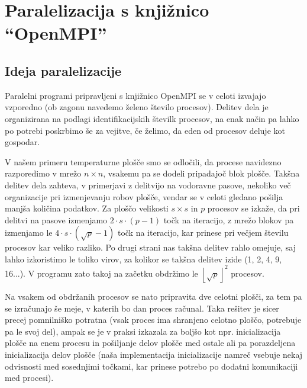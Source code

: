 \documentclass[a4paper,titlepage,11pt]{article}
\begin{document}
\pagebreak

\section{Paralelizacija s knjižnico ``OpenMPI''}
\label{poglavje-mpi}

\subsection{Ideja paralelizacije}

Paralelni programi pripravljeni s knjižnico OpenMPI se v celoti izvajajo vzporedno (ob zagonu navedemo želeno število procesov). Delitev dela je organizirana na podlagi identifikacijskih številk procesov, na enak način pa lahko po potrebi poskrbimo še za vejitve, če želimo, da eden od procesov deluje kot gospodar.

V našem primeru temperaturne plošče smo se odločili, da procese navidezno razporedimo v mrežo \(n \times n\), vsakemu pa se dodeli pripadajoč blok plošče. Takšna delitev dela zahteva, v primerjavi z delitvijo na vodoravne pasove, nekoliko več organizacije pri izmenjevanju robov plošče, vendar se v celoti gledano pošilja manjša količina podatkov. Za ploščo velikosti \(s \times s\) in \(p\) procesov se izkaže, da pri delitvi na pasove izmenjamo \(2 \cdot s \cdot (p-1)\) točk na iteracijo, z mrežo blokov pa izmenjamo le \(4 \cdot s \cdot (\sqrt{p}-1)\) točk na iteracijo, kar prinese pri večjem številu procesov kar veliko razliko. Po drugi strani nas takšna delitev rahlo omejuje, saj lahko izkoristimo le toliko virov, za kolikor se takšna delitev izide (1, 2, 4, 9, 16...). V programu zato takoj na začetku obdržimo le \(\left \lfloor{\sqrt{p}}\right \rfloor ^ 2\) procesov.

Na vsakem od obdržanih procesov se nato pripravita dve celotni plošči, za tem pa se izračunajo še meje, v katerih bo dan proces računal. Taka rešitev je sicer precej pomnilniško potratna (vsak proces ima shranjeno celotno ploščo, potrebuje pa le svoj del), ampak se je v praksi izkazala za boljšo kot npr. inicializacija plošče na enem procesu in pošiljanje delov plošče med ostale ali pa porazdeljena inicializacija delov plošče (naša implementacija inicializacije namreč vsebuje nekaj odvisnosti med sosednjimi točkami, kar prinese potrebo po dodatni komunikaciji med procesi).
\end{document}
